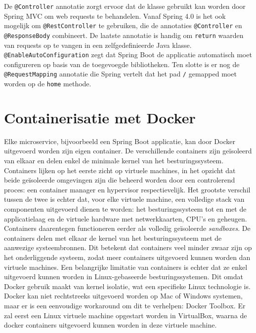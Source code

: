 De \texttt{@Controller} annotatie zorgt ervoor dat de klasse gebruikt kan worden door Spring MVC om web requests te behandelen. Vanaf Spring 4.0 is het ook mogelijk om \texttt{@RestController} te gebruiken, die de annotaties \texttt{@Controller} en \texttt{@ResponseBody} combineert. De laatste annotatie is handig om \texttt{return} waarden van requests op te vangen in een zelfgedefinieerde Java klasse. \texttt{@EnableAutoConfiguration} zegt dat Spring Boot de applicatie automatisch moet configureren op basis van de toegevoegde bibliotheken. Ten slotte is er nog de \texttt{@RequestMapping} annotatie die Spring vertelt dat het pad \texttt{/} gemapped moet worden op de \texttt{home} methode. \\

\section{Containerisatie met Docker}
\label{sec:docker}

Elke microservice, bijvoorbeeld een Spring Boot applicatie, kan door Docker uitgevoerd worden zijn eigen container. De verschillende containers zijn geïsoleerd van elkaar en delen enkel de minimale kernel van het besturingssysteem. Containers lijken op het eerste zicht op virtuele machines, in het opzicht dat beide geïsoleerde omgevingen zijn die beheerd worden door een controlerend proces: een container manager en hypervisor respectievelijk. Het grootste verschil tussen de twee is echter dat, voor elke virtuele machine, een volledige stack van componenten uitgevoerd dienen te worden: het besturingssysteem tot en met de applicatielaag en de virtuele hardware met netwerkkaarten, CPU's en geheugen. \\

Containers daarentegen functioneren eerder als volledig geïsoleerde \textit{sandboxes}. De containers delen met elkaar de kernel van het besturingssysteem met de aanwezige systeembronnen. Dit betekent dat containers veel minder zwaar zijn op het onderliggende systeem, zodat meer containers uitgevoerd kunnen worden dan virtuele machines. Een belangrijke limitatie van containers is echter dat ze enkel uitgevoerd kunnen worden in Linux-gebaseerde besturingssystemen. Dit omdat Docker gebruik maakt van kernel isolatie, wat een specifieke Linux technologie is. \\

Docker kan niet rechtstreeks uitgevoerd worden op Mac of Windows systemen, maar er is een eenvoudige workaround om dit te verhelpen: Docker Toolbox. Er zal eerst een Linux virtuele machine opgestart worden in VirtualBox, waarna de docker containers uitgevoerd kunnen worden in deze virtuele machine. \\



